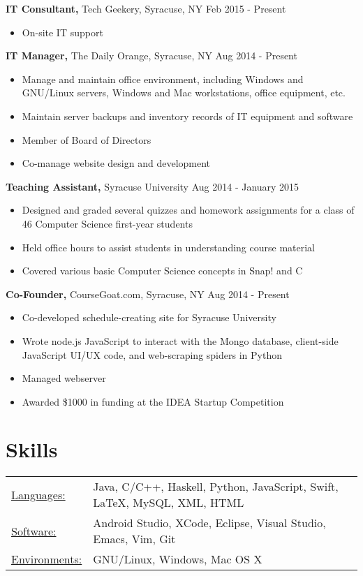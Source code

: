 \documentclass[margin]{res}
\begin{document}
\begin{resume}
 {\bf IT Consultant,} Tech Geekery, Syracuse, NY \hfill  Feb 2015 - Present
\begin{itemize} \itemsep -2pt %
\item On-site IT support
\end{itemize}
 
{\bf IT Manager,} The Daily Orange, Syracuse, NY \hfill  Aug 2014 - Present
\begin{itemize} \itemsep -2pt %
\item Manage and maintain office environment, including Windows and GNU/Linux servers, Windows and Mac workstations, office equipment, etc.
\item Maintain server backups and inventory records of IT equipment and software
\item Member of Board of Directors
\item Co-manage website design and development
\end{itemize}

{\bf Teaching Assistant,} Syracuse University \hfill  Aug 2014 - January 2015
\begin{itemize} \itemsep -2pt %
\item Designed and graded several quizzes and homework assignments for a class of 46 Computer Science first-year students
\item Held office hours to assist students in understanding course material
\item Covered various basic Computer Science concepts in Snap! and C
\end{itemize}

{\bf Co-Founder,} CourseGoat.com, Syracuse, NY \hfill
Aug 2014 - Present            
\begin{itemize} \itemsep -2pt
\item  Co-developed schedule-creating site for Syracuse University
\item Wrote node.js JavaScript to interact with the Mongo database, client-side JavaScript UI/UX code, and web-scraping spiders in Python
\item Managed webserver
\item Awarded \$1000 in funding at the IDEA Startup Competition
\end{itemize}




 

\section{Skills}
   \begin{tabular}{l p{3in}}
    \underline{Languages:} & Java, C/C++, Haskell, Python, JavaScript, Swift, \LaTeX , MySQL, XML, HTML \\
     \underline{Software:} & Android Studio, XCode, Eclipse, Visual Studio, Emacs, Vim, Git  \\
     \underline{Environments:} & GNU/Linux, Windows, Mac OS X
     

\end{tabular}
\end{resume}
\end{document}
